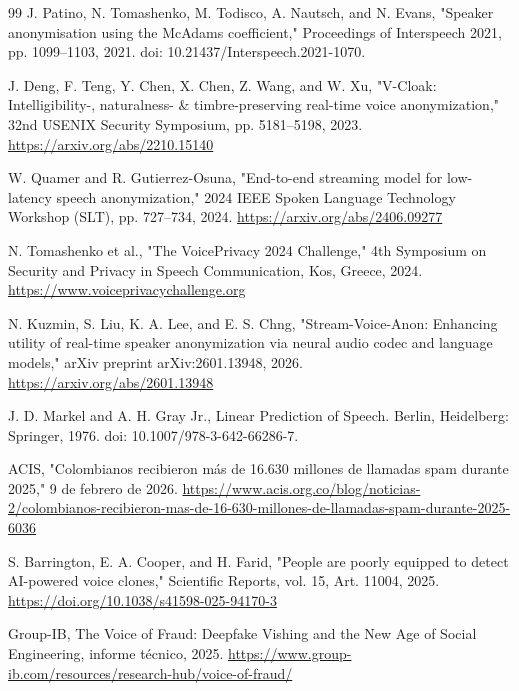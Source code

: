 \documentclass[10pt,twocolumn]{article}
\begin{document}
\begin{thebibliography}{99}
J. Patino, N. Tomashenko, M. Todisco, A. Nautsch, and N. Evans, "Speaker anonymisation using the McAdams coefficient," Proceedings of Interspeech 2021, pp. 1099--1103, 2021. doi: 10.21437/Interspeech.2021-1070.

J. Deng, F. Teng, Y. Chen, X. Chen, Z. Wang, and W. Xu, "V-Cloak: Intelligibility-, naturalness- \& timbre-preserving real-time voice anonymization," 32nd USENIX Security Symposium, pp. 5181--5198, 2023. \url{https://arxiv.org/abs/2210.15140}

W. Quamer and R. Gutierrez-Osuna, "End-to-end streaming model for low-latency speech anonymization," 2024 IEEE Spoken Language Technology Workshop (SLT), pp. 727--734, 2024. \url{https://arxiv.org/abs/2406.09277}

N. Tomashenko et al., "The VoicePrivacy 2024 Challenge," 4th Symposium on Security and Privacy in Speech Communication, Kos, Greece, 2024. \url{https://www.voiceprivacychallenge.org}

N. Kuzmin, S. Liu, K. A. Lee, and E. S. Chng, "Stream-Voice-Anon: Enhancing utility of real-time speaker anonymization via neural audio codec and language models," arXiv preprint arXiv:2601.13948, 2026. \url{https://arxiv.org/abs/2601.13948}

J. D. Markel and A. H. Gray Jr., Linear Prediction of Speech. Berlin, Heidelberg: Springer, 1976. doi: 10.1007/978-3-642-66286-7.

ACIS, "Colombianos recibieron más de 16.630 millones de llamadas spam durante 2025," 9 de febrero de 2026. \url{https://www.acis.org.co/blog/noticias-2/colombianos-recibieron-mas-de-16-630-millones-de-llamadas-spam-durante-2025-6036}

S. Barrington, E. A. Cooper, and H. Farid, "People are poorly equipped to detect AI-powered voice clones," Scientific Reports, vol. 15, Art. 11004, 2025. \url{https://doi.org/10.1038/s41598-025-94170-3}

Group-IB, The Voice of Fraud: Deepfake Vishing and the New Age of Social Engineering, informe técnico, 2025. \url{https://www.group-ib.com/resources/research-hub/voice-of-fraud/}


\end{thebibliography}
\end{document}
